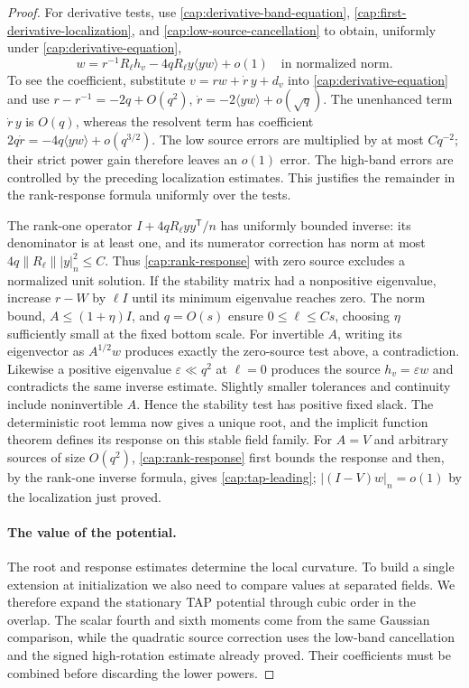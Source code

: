\begin{proof}
For derivative tests, use \eqref{cap:derivative-band-equation},
\eqref{cap:first-derivative-localization}, and
\eqref{cap:low-source-cancellation} to obtain, uniformly under
\eqref{cap:derivative-equation},
\begin{equation}\label{cap:rank-response}
 w=r^{-1}R_\ell h_v
        -4qR_\ell y\langle yw\rangle+o(1)
 \quad\text{in normalized norm}.
\end{equation}
To see the coefficient, substitute $v=rw+\dot r\,y+d_v$ into
\eqref{cap:derivative-equation} and use $r-r^{-1}=-2q+O(q^2)$, $\dot
r=-2\langle yw\rangle+o(\sqrt q)$. The unenhanced term $\dot r\,y$ is $O(q)$,
whereas the resolvent term has coefficient $2q\dot r=-4q\langle
yw\rangle+o(q^{3/2})$. The low source errors are multiplied by at most
$Cq^{-2}$; their strict power gain therefore leaves an $o(1)$ error. The
high-band errors are controlled by the preceding localization estimates. This
justifies the remainder in the rank-response formula uniformly over the tests.

The rank-one operator $I+4qR_\ell yy^{\mathsf T}/n$ has uniformly bounded
inverse: its denominator is at least one, and its numerator correction has
norm at most $4q\|R_\ell\||y|_n^2\le C$. Thus \eqref{cap:rank-response} with
zero source excludes a normalized unit solution. If the stability matrix had a
nonpositive eigenvalue, increase $r-W$ by $\ell I$ until its minimum
eigenvalue reaches zero. The norm bound, $A\le(1+\eta)I$, and $q=O(s)$ ensure
$0\le\ell\le Cs$, choosing $\eta$ sufficiently small at the fixed bottom
scale. For invertible $A$, writing its eigenvector as $A^{1/2}w$ produces
exactly the zero-source test above, a contradiction. Likewise a positive
eigenvalue $\varepsilon\ll q^2$ at $\ell=0$ produces the source
$h_v=\varepsilon w$ and contradicts the same inverse estimate. Slightly
smaller tolerances and continuity include noninvertible \(A\). Hence the
stability test has positive fixed slack. The deterministic root lemma now
gives a unique root, and the implicit function theorem defines its response
on this stable field family. For \(A=V\) and arbitrary sources of
size $O(q^2)$, \eqref{cap:rank-response} first bounds the response and then,
by the rank-one inverse formula, gives \eqref{cap:tap-leading};
$|(I-V)w|_n=o(1)$ by the localization just proved.

\paragraph{The value of the potential.}
The root and response estimates determine the local curvature. To build a
single extension at initialization we also need to compare values at
separated fields. We therefore expand the stationary TAP potential through
cubic order in the overlap. The scalar fourth and sixth moments come from
the same Gaussian comparison, while the quadratic source correction uses
the low-band cancellation and the signed high-rotation estimate already
proved. Their coefficients must be combined before discarding the lower
powers.


\end{proof}
